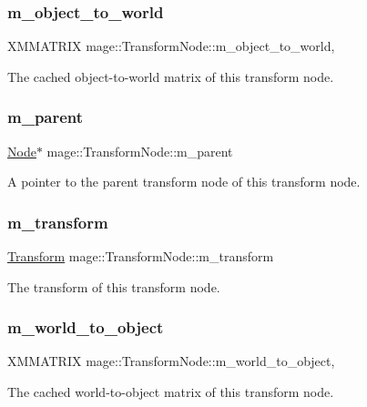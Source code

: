 \subsubsection{\texorpdfstring{m\+\_\+object\+\_\+to\+\_\+world}{m\_object\_to\_world}}
{\footnotesize\ttfamily X\+M\+M\+A\+T\+R\+IX mage\+::\+Transform\+Node\+::m\+\_\+object\+\_\+to\+\_\+world\hspace{0.3cm}{\ttfamily [mutable]}, {\ttfamily [private]}}

The cached object-\/to-\/world matrix of this transform node. \hypertarget{classmage_1_1_transform_node_afad4b8198a5e4b1a3c46fb8e51fd17c2}{}\label{classmage_1_1_transform_node_afad4b8198a5e4b1a3c46fb8e51fd17c2} 
\subsubsection{\texorpdfstring{m\+\_\+parent}{m\_parent}}
{\footnotesize\ttfamily \hyperlink{classmage_1_1_node}{Node}$\ast$ mage\+::\+Transform\+Node\+::m\+\_\+parent\hspace{0.3cm}{\ttfamily [private]}}

A pointer to the parent transform node of this transform node. \hypertarget{classmage_1_1_transform_node_aa93f15e689cc9c938acfc260dc71c136}{}\label{classmage_1_1_transform_node_aa93f15e689cc9c938acfc260dc71c136} 
\subsubsection{\texorpdfstring{m\+\_\+transform}{m\_transform}}
{\footnotesize\ttfamily \hyperlink{classmage_1_1_transform}{Transform} mage\+::\+Transform\+Node\+::m\+\_\+transform\hspace{0.3cm}{\ttfamily [private]}}

The transform of this transform node. \hypertarget{classmage_1_1_transform_node_ade413fc9a980ce8e1191c17f94f25e3f}{}\label{classmage_1_1_transform_node_ade413fc9a980ce8e1191c17f94f25e3f} 
\subsubsection{\texorpdfstring{m\+\_\+world\+\_\+to\+\_\+object}{m\_world\_to\_object}}
{\footnotesize\ttfamily X\+M\+M\+A\+T\+R\+IX mage\+::\+Transform\+Node\+::m\+\_\+world\+\_\+to\+\_\+object\hspace{0.3cm}{\ttfamily [mutable]}, {\ttfamily [private]}}

The cached world-\/to-\/object matrix of this transform node. 